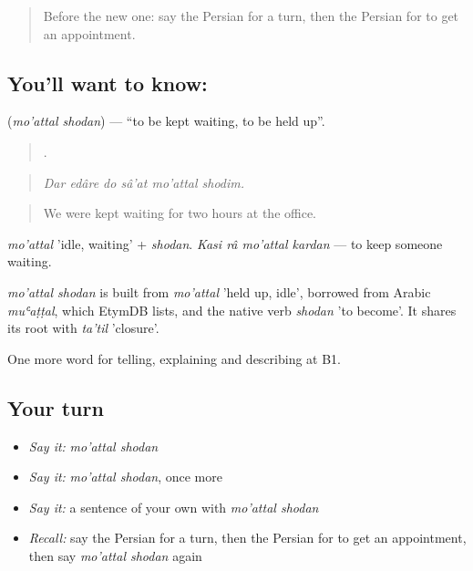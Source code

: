 \label{lesson:FA-C452-moattal-shodan}



\begin{quote}
Before the new one: say the Persian for a turn, then the Persian for to get an appointment.
\end{quote}

\subsection*{You'll want to know:  }
\textbf{ } (\emph{mo'attal shodan}) — \textquotedblleft{}to be kept waiting, to be held up\textquotedblright{}.

\begin{quote}
     .
\end{quote}

\begin{quote}
\emph{Dar edâre do sâ'at mo'attal shodim.}
\end{quote}

\begin{quote}
We were kept waiting for two hours at the office.
\end{quote}

\emph{mo'attal} 'idle, waiting' + \emph{shodan}. \emph{Kasi râ mo'attal kardan} — to keep someone waiting.

\begin{cousinweb}
\emph{mo'attal shodan} is built from \emph{mo'attal} 'held up, idle', borrowed from Arabic \emph{muʿaṭṭal}, which EtymDB lists, and the native verb \emph{shodan} 'to become'. It shares its root with \emph{ta'til} 'closure'.
\end{cousinweb}

\begin{grammarlens}[title={What you've built}]
One more word for telling, explaining and describing at B1.
\end{grammarlens}

\subsection*{Your turn}
\begin{itemize}
\raggedright
  \item \emph{Say it:} \emph{mo'attal shodan}
  \item \emph{Say it:} \emph{mo'attal shodan}, once more
  \item \emph{Say it:} a sentence of your own with \emph{mo'attal shodan}
  \item \emph{Recall:} say the Persian for a turn, then the Persian for to get an appointment, then say \emph{mo'attal shodan} again
\end{itemize}


